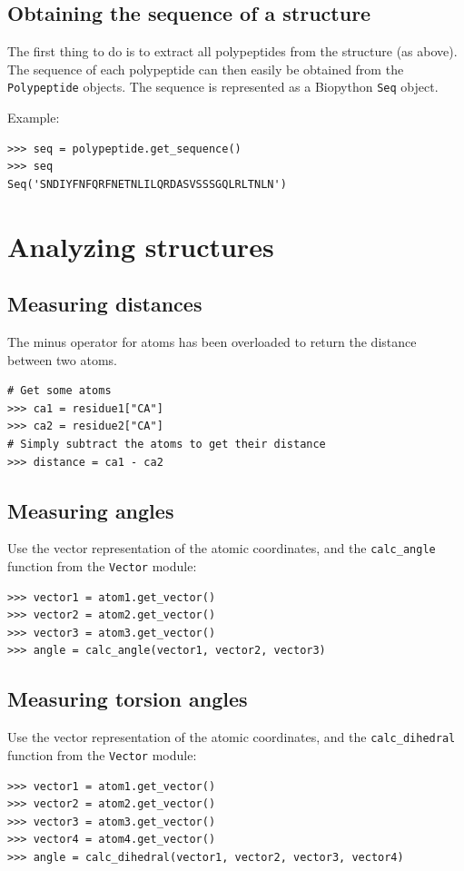 \subsection*{Obtaining the sequence of a structure}

The first thing to do is to extract all polypeptides from the structure
(as above). The sequence of each polypeptide can then easily
be obtained from the \texttt{Polypeptide} objects. The sequence is
represented as a Biopython \texttt{Seq} object.

Example:

\begin{verbatim}
>>> seq = polypeptide.get_sequence()
>>> seq
Seq('SNDIYFNFQRFNETNLILQRDASVSSSGQLRLTNLN')
\end{verbatim}

\section{Analyzing structures}

\subsection{Measuring distances}
The minus operator for atoms has been overloaded to return the distance between two atoms.
\begin{verbatim}
# Get some atoms
>>> ca1 = residue1["CA"]
>>> ca2 = residue2["CA"]
# Simply subtract the atoms to get their distance
>>> distance = ca1 - ca2
\end{verbatim}

\subsection{Measuring angles}
Use the vector representation of the atomic coordinates, and
the \texttt{calc\_angle} function from the \texttt{Vector} module:
\begin{verbatim}
>>> vector1 = atom1.get_vector()
>>> vector2 = atom2.get_vector()
>>> vector3 = atom3.get_vector()
>>> angle = calc_angle(vector1, vector2, vector3)
\end{verbatim}

\subsection{Measuring torsion angles}
Use the vector representation of the atomic coordinates, and
the \texttt{calc\_dihedral} function from the \texttt{Vector} module:
\begin{verbatim}
>>> vector1 = atom1.get_vector()
>>> vector2 = atom2.get_vector()
>>> vector3 = atom3.get_vector()
>>> vector4 = atom4.get_vector()
>>> angle = calc_dihedral(vector1, vector2, vector3, vector4)
\end{verbatim}


